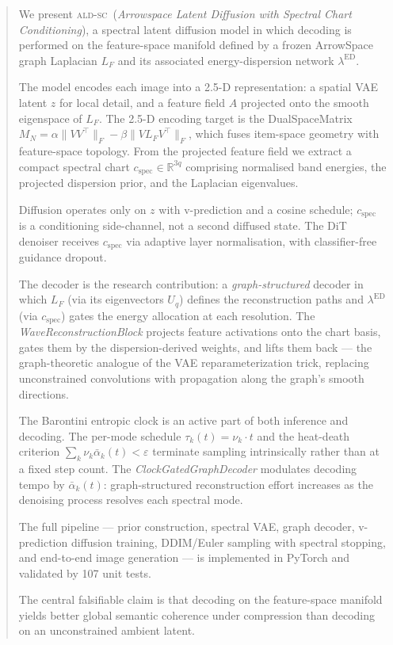 \documentclass[11pt]{article}
\newcommand{\ALDSC}{\textsc{ald-sc}}
\begin{document}
    \begin{abstract}
    We present \ALDSC~(\emph{Arrowspace Latent Diffusion with Spectral
    Chart Conditioning}), a spectral latent diffusion model in which
    decoding is performed on the feature-space manifold defined by a
    frozen ArrowSpace graph Laplacian $L_F$ and its associated
    energy-dispersion network $\lambda^{\mathrm{ED}}$.

    The model encodes each image into a 2.5-D representation: a spatial
    VAE latent $z$ for local detail, and a feature field $A$ projected
    onto the smooth eigenspace of $L_F$. The 2.5-D encoding target is
    the DualSpaceMatrix $M_N = \alpha\|VV^\top\|_F - \beta\|V L_F
    V^\top\|_F$, which fuses item-space geometry with feature-space
    topology. From the projected feature field we extract a compact
    spectral chart $c_{\mathrm{spec}} \in \mathbb{R}^{3q}$ comprising
    normalised band energies, the projected dispersion prior, and the
    Laplacian eigenvalues.

    Diffusion operates only on $z$ with v-prediction and a cosine
    schedule; $c_{\mathrm{spec}}$ is a conditioning side-channel, not a
    second diffused state. The DiT denoiser receives $c_{\mathrm{spec}}$
    via adaptive layer normalisation, with classifier-free guidance
    dropout.

    The decoder is the research contribution: a \emph{graph-structured}
    decoder in which $L_F$ (via its eigenvectors $U_q$) defines the
    reconstruction paths and $\lambda^{\mathrm{ED}}$ (via
    $c_{\mathrm{spec}}$) gates the energy allocation at each resolution.
    The \emph{WaveReconstructionBlock} projects feature activations onto
    the chart basis, gates them by the dispersion-derived weights, and
    lifts them back --- the graph-theoretic analogue of the VAE
    reparameterization trick, replacing unconstrained convolutions with
    propagation along the graph's smooth directions.

    The Barontini entropic clock is an active part of both inference and
    decoding. The per-mode schedule $\tau_k(t) = \nu_k \cdot t$ and the
    heat-death criterion $\sum_k \nu_k \bar\alpha_k(t) < \varepsilon$
    terminate sampling intrinsically rather than at a fixed step count.
    The \emph{ClockGatedGraphDecoder} modulates decoding tempo by
    $\bar\alpha_k(t)$: graph-structured reconstruction effort increases
    as the denoising process resolves each spectral mode.

    The full pipeline --- prior construction, spectral VAE, graph
    decoder, v-prediction diffusion training, DDIM/Euler sampling with
    spectral stopping, and end-to-end image generation --- is
    implemented in PyTorch and validated by 107 unit tests.

    The central falsifiable claim is that decoding on the feature-space
    manifold yields better global semantic coherence under compression
    than decoding on an unconstrained ambient latent.
    \end{abstract}
\end{document}
